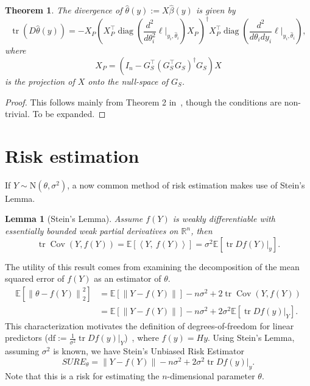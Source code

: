\documentclass[11pt]{article}
\newcommand{\norm}[1]{\left\lVert #1 \right\rVert}
\newcommand{\R}{\mathbb{R}}
\newcommand{\E}{\mathbb{E}}
\newcommand{\Expect}[1]{\E\left[#1\right]}
\renewcommand{\hat}{\widehat}
\DeclareMathOperator*{\trace}{tr}
\DeclareMathOperator*{\Cov}{Cov}
\DeclareMathOperator*{\diag}{diag}
\theoremstyle{plain}
\newtheorem{theorem}{Theorem}
\newtheorem{lemma}[lemma]{Lemma}
\begin{document}
\begin{theorem}
\label{thm:regression-divergence}
  The divergence of $\hat\theta(y) := X\hat\beta(y)$ is given by
  \begin{equation}
    \label{eq:5}
    \trace\left(D \hat\theta(y)\right) = -X_P \left(X^\top_P
      \diag\left(\frac{d^2}{d\theta_i^2}\ell
        \bigg\vert_{y_i,\hat{\theta}_i}\right) X_P\right)^\dagger X^\top_P
      \diag\left(\frac{d^2}{d\theta_i d y_i} \ell \bigg\vert_{y_i,\hat{\theta}_i}\right),
    \end{equation}
    where 
    \begin{equation}
      \label{eq:6}
      X_P =( I_n - G_S^\top (G_S^\top G_S)^\dagger G_S) X
    \end{equation}
    is the projection of $X$ onto the null-space of $G_S$.
\end{theorem}

\begin{proof}
  This follows mainly from Theorem 2 in~\citep{VaiterDeledalle2017},
  though the conditions are non-trivial. To be expanded.
\end{proof}


\section{Risk estimation}
\label{sec:risk-estimation}

If $Y \sim \mbox{N}(\theta, \sigma^2)$, a now common method of risk
estimation makes use of Stein's Lemma.
\begin{lemma}[Stein's Lemma]
  Assume $f(Y)$ is weakly differentiable with essentially
  bounded weak partial derivatives on $\R^n$, then
  \begin{equation}
    \label{eq:8}
    \trace \Cov(Y,f(Y)) = \Expect{\left\langle Y,\ f(Y)\right\rangle} = \sigma^2\Expect{\trace Df(Y) \bigg\vert_y }.
  \end{equation}
\end{lemma}
The utility of this result comes from examining the decomposition of
the mean squared error of $f(Y)$ as an estimator of $\theta$.
\begin{align}
  \label{eq:9}
  \Expect{\norm{\theta-f(Y)}_2^2} 
  &= \Expect{\norm{Y-f(Y)}} -n\sigma^2 + 2
    \trace\Cov(Y,f(Y))\\
  &= \Expect{\norm{Y-f(Y)}} -n\sigma^2 + 2\sigma^2
    \Expect{\trace Df(y) \bigg\vert_Y} .
\end{align}
This characterization motivates the definition of degrees-of-freedom
for linear predictors ($\textrm{df} :=\frac{1}{\sigma^2} \trace
Df(y)\big\vert_Y$)~\citep{efron1986biased}, where $f(y)=Hy$. Using 
Stein's Lemma, assuming $\sigma^2$ is known, we have Stein's Unbiased
Risk Estimator
\begin{equation}
  \label{eq:10}
  SURE_\theta = \norm{Y-f(Y)} -n\sigma^2 + 2\sigma^2\trace Df(y) \bigg\vert_y.
\end{equation}
Note that this is a risk for estimating the $n$-dimensional parameter $\theta$.
\end{document}

